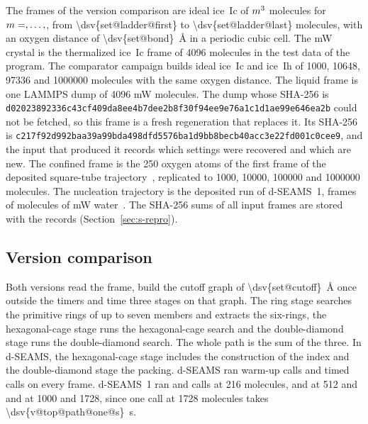 \documentclass[preprint,12pt]{elsarticle}
\begin{document}
The frames of the version comparison are ideal ice~Ic of
$\dsv{set@cellsites}m^3$ molecules for
$m=\dsv{set@cells@first},\dots,\dsv{set@cells@last}$, from
\num{\dsv{set@ladder@first}} to \num{\dsv{set@ladder@last}} molecules,
with an oxygen distance of \qty{\dsv{set@bond}}{\angstrom} in a periodic
cubic cell.
The mW crystal is the thermalized ice~Ic frame of \num{4096} molecules
in the test data of the program.
The comparator campaign builds ideal ice~Ic and ice~Ih of \num{1000},
\num{10648}, \num{97336} and \num{1000000} molecules with the same
oxygen distance.
The liquid frame is one LAMMPS dump of \num{4096} mW molecules.
The dump whose SHA-256 is
\texttt{d02023892336c43cf409da8ee4b7dee2b8f30f94ee9e76a1c1d1ae99e646ea2b}
could not be fetched, so this frame is a fresh regeneration that
replaces it.
Its SHA-256 is
\texttt{c217f92d992baa39a99bda498dfd5576ba1d9bb8becb40acc3e22fd001c0cee9},
and the input that produced it records which settings were recovered
and which are new.
The confined frame is the \num{250} oxygen atoms of the first frame of
the deposited square-tube trajectory~\cite{goswami2019nanotubedata},
replicated to \num{1000}, \num{10000}, \num{100000} and \num{1000000}
molecules.
The nucleation trajectory is the deposited run of d-SEAMS~1,
 frames of  molecules of mW
water~\cite{goswami2019nucleationdata,molinero2009mw}.
The SHA-256 sums of all input frames are stored with the records
(Section~\ref{sec:s-repro}).

\subsection{Version comparison}
\label{sec:s-versions}

Both versions read the frame, build the cutoff graph of
\qty{\dsv{set@cutoff}}{\angstrom} once outside the timers and time three
stages on that graph.
The ring stage searches the primitive rings of up to seven members and
extracts the six-rings, the hexagonal-cage stage runs the hexagonal-cage
search and the double-diamond stage runs the double-diamond search.
The whole path is the sum of the three.
In d-SEAMS, the hexagonal-cage stage includes the construction of the
index and the double-diamond stage the packing.
d-SEAMS ran  warm-up calls and 
timed calls on every frame.
d-SEAMS~1 ran  and  calls
at \num{216} molecules,  and
 at \num{512} and  and
 at \num{1000} and \num{1728}, since one call
at \num{1728} molecules takes \qty{\dsv{v@top@path@one@s}}{\second}.
\end{document}
